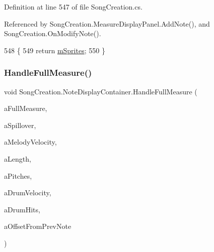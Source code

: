 Definition at line 547 of file Song\+Creation.\+cs.



Referenced by Song\+Creation.\+Measure\+Display\+Panel.\+Add\+Note(), and Song\+Creation.\+On\+Modify\+Note().


\begin{DoxyCode}
548         \{
549             \textcolor{keywordflow}{return} \hyperlink{class_song_creation_1_1_note_display_container_ab8dbbd27a233f83f0402608e15699ecf}{mSprites};
550         \}
\end{DoxyCode}
\mbox{\label{class_song_creation_1_1_note_display_container_a71314773e75bc3678c6f4078f1a222d1}} 
\subsubsection{\texorpdfstring{Handle\+Full\+Measure()}{HandleFullMeasure()}}
{\footnotesize\ttfamily void Song\+Creation.\+Note\+Display\+Container.\+Handle\+Full\+Measure (\begin{DoxyParamCaption}\item[{\hyperlink{class_song_creation_1_1_measure_display_panel}{Measure\+Display\+Panel}}]{a\+Full\+Measure,  }\item[{float}]{a\+Spillover,  }\item[{int}]{a\+Melody\+Velocity,  }\item[{\hyperlink{group___music_enums_gaf11b5f079adbb21c800b9eca1c5c3cbd}{Music.\+N\+O\+T\+E\+\_\+\+L\+E\+N\+G\+TH}}]{a\+Length,  }\item[{\hyperlink{group___music_enums_ga508f69b199ea518f935486c990edac1d}{Music.\+P\+I\+T\+CH} \mbox{[}$\,$\mbox{]}}]{a\+Pitches,  }\item[{int}]{a\+Drum\+Velocity,  }\item[{\hyperlink{group___music_enums_gade475b4382c7066d1af13e7c13c029b6}{Music.\+D\+R\+UM} \mbox{[}$\,$\mbox{]}}]{a\+Drum\+Hits,  }\item[{\hyperlink{group___music_enums_gaf11b5f079adbb21c800b9eca1c5c3cbd}{Music.\+N\+O\+T\+E\+\_\+\+L\+E\+N\+G\+TH}}]{a\+Offset\+From\+Prev\+Note }\end{DoxyParamCaption})}



